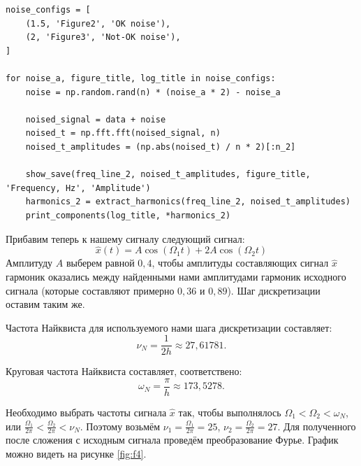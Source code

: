 \documentclass[a4paper,14pt]{article}
\theoremstyle{definition}
\begin{document}
	\begin{lstlisting}[style=py, caption={Работа с зашумленным сигналом}, label={lst:noise}]
noise_configs = [
	(1.5, 'Figure2', 'OK noise'),
	(2, 'Figure3', 'Not-OK noise'),
]

for noise_a, figure_title, log_title in noise_configs:
	noise = np.random.rand(n) * (noise_a * 2) - noise_a
	
	noised_signal = data + noise
	noised_t = np.fft.fft(noised_signal, n)
	noised_t_amplitudes = (np.abs(noised_t) / n * 2)[:n_2]
	
	show_save(freq_line_2, noised_t_amplitudes, figure_title, 'Frequency, Hz', 'Amplitude')
	harmonics_2 = extract_harmonics(freq_line_2, noised_t_amplitudes)
	print_components(log_title, *harmonics_2)
	\end{lstlisting}
	
	Прибавим теперь к нашему сигналу следующий сигнал:
	\begin{equation}
		\label{eq:newaddsig}
		\widehat{x}(t) = A\cos(\Omega_1 t) + 2 A\cos(\Omega_2 t)
	\end{equation}
	Амплитуду $A$ выберем равной $0,4$, чтобы амплитуды составляющих сигнал $\widehat{x}$ гармоник оказались между найденными нами амплитудами гармоник исходного сигнала (которые составляют примерно $0,36$ и $0,89$). Шаг дискретизации оставим таким же.
	
	Частота Найквиста для используемого нами шага дискретизации составляет:
	\begin{equation}\label{eq:nyqf}
		\nu_N = \frac{1}{2 h} \approx 27,61781.
	\end{equation}
	
	Круговая частота Найквиста составляет, соответствено:
	\begin{equation}\label{eq:nyqw}
		\omega_N = \frac{\pi}{h} \approx 173,5278.
	\end{equation}
	
	Необходимо выбрать частоты сигнала $\widehat{x}$ так, чтобы выполнялось $\Omega_1 < \Omega_2 < \omega_N$, или $\frac{\Omega_1}{2 \pi} <\frac{\Omega_2}{2 \pi} < \nu_N$. Поэтому возьмём $\nu_1 = \frac{\Omega_1}{2 \pi} = 25$, $\nu_2 = \frac{\Omega_2}{2 \pi} = 27$. Для полученного после сложения с исходным сигнала проведём преобразование Фурье. График можно видеть на рисунке \ref{fig:f4}. 
	
\end{document}
